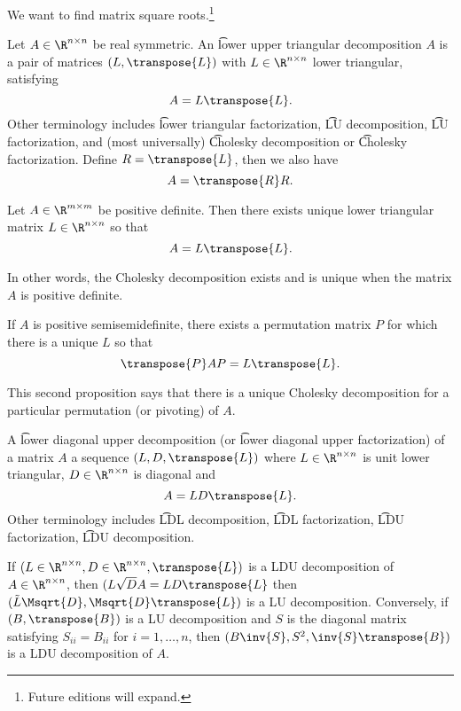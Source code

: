 

We want to find matrix square roots.\footnote{Future editions will expand.}


Let $A \in \R^{n \times n}$ be real symmetric.
An \t{lower upper triangular decomposition}
$A$ is a pair of matrices $(L, \transpose{L})$ with $L \in \R^{n \times n}$ lower triangular, satisfying
\[
  A = L\transpose{L}.
\]
Other terminology includes \t{lower triangular factorization}, \t{LU decomposition}, \t{LU factorization}, and (most universally) \t{Cholesky decomposition} or \t{Cholesky factorization}.
Define $R = \transpose{L}$, then we also have
\[
  A = \transpose{R}R.
\]


\begin{proposition}
  Let $A \in \R^{m \times m}$ be positive definite. Then there exists unique lower triangular matrix $L \in \R^{n \times n}$ so that
  \[
    A = L\transpose{L}.
  \]
\end{proposition}
In other words, the Cholesky decomposition exists and is unique when the matrix $A$ is positive definite.

\begin{proposition}
  If $A$ is positive semisemidefinite, there exists a permutation matrix $P$ for which there is a unique  $L$ so that
  \[
    \transpose{P}AP = L\transpose{L}.
  \]
\end{proposition}

This second proposition says that there is a unique Cholesky decomposition for a particular permutation (or pivoting) of $A$.


A \t{lower diagonal upper decomposition} (or \t{lower diagonal upper factorization}) of a matrix $A$ a sequence $(L, D, \transpose{L})$ where $L \in \R^{n \times n}$ is unit lower triangular, $D \in \R^{n \times n}$  is diagonal and
\[
  A = LD\transpose{L}.
\]
Other terminology includes \t{LDL decomposition}, \t{LDL factorization}, \t{LDU factorization}, \t{LDU decomposition}.

If $(L \in \R^{n \times n}, D \in \R^{n \times n}, \transpose{L})$ is a LDU decomposition of $A \in \R^{n \times n}$, then $(L\sqrt{D}A = LD\transpose{L}$ then $(\tilde{L}\Msqrt{D}, \Msqrt{D}\transpose{L})$ is a LU decomposition.
Conversely, if $(B, \transpose{B})$ is a LU decomposition and $S$ is the diagonal matrix satisfying $S_{ii} = B_{ii}$ for $i = 1, \dots, n$, then $(B\inv{S}, S^2, \inv{S}\transpose{B})$ is a LDU decomposition of $A$.

